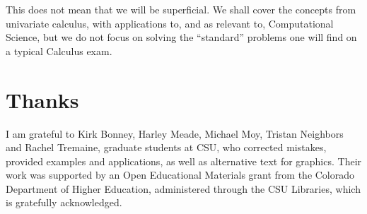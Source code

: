 This does not mean that we will be superficial. We shall cover the concepts
from univariate calculus, with applications to, and as relevant to,
Computational Science, but we do not focus on solving the ``standard''
problems one will find on a typical Calculus exam.




\section*{Thanks}


I am grateful to Kirk Bonney, Harley Meade, Michael Moy, Tristan Neighbors
and  Rachel Tremaine, graduate students at CSU, who corrected mistakes,
provided examples and applications, as well as alternative text for graphics.
Their work was supported by an Open Educational Materials grant from the
Colorado Department of Higher Education, administered through the CSU
Libraries, which is gratefully acknowledged.
